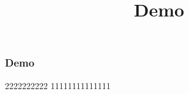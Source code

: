 \documentclass[notheorems]{beamer}
\title[]{Demo}
\begin{document}

\begin{frame}
  \frametitle{Demo}
    2222222222  
	11111111111111
  
\end{frame} 
 
\end{document}
